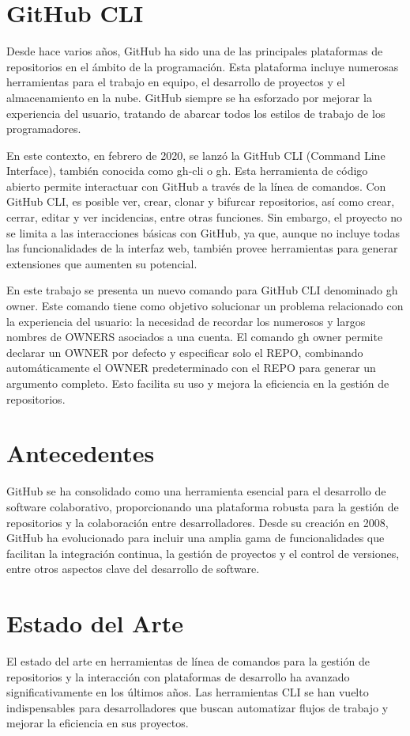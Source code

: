 \section{GitHub CLI}
Desde hace varios años, GitHub ha sido una de las principales plataformas de repositorios en el ámbito de la programación. Esta plataforma incluye numerosas herramientas para el trabajo en equipo, el desarrollo de proyectos y el almacenamiento en la nube. GitHub siempre se ha esforzado por mejorar la experiencia del usuario, tratando de abarcar todos los estilos de trabajo de los programadores.

En este contexto, en febrero de 2020, se lanzó la GitHub CLI (Command Line Interface), también conocida como gh-cli o gh. Esta herramienta de código abierto permite interactuar con GitHub a través de la línea de comandos. Con GitHub CLI, es posible ver, crear, clonar y bifurcar repositorios, así como crear, cerrar, editar y ver incidencias, entre otras funciones. Sin embargo, el proyecto no se limita a las interacciones básicas con GitHub, ya que, aunque no incluye todas las funcionalidades de la interfaz web, también provee herramientas para generar extensiones que aumenten su potencial.

En este trabajo se presenta un nuevo comando para GitHub CLI denominado gh owner. Este comando tiene como objetivo solucionar un problema relacionado con la experiencia del usuario: la necesidad de recordar los numerosos y largos nombres de OWNERS asociados a una cuenta. El comando gh owner permite declarar un OWNER por defecto y especificar solo el REPO, combinando automáticamente el OWNER predeterminado con el REPO para generar un argumento completo. Esto facilita su uso y mejora la eficiencia en la gestión de repositorios.

\section{Antecedentes}
GitHub se ha consolidado como una herramienta esencial para el desarrollo de software colaborativo, proporcionando una plataforma robusta para la gestión de repositorios y la colaboración entre desarrolladores. Desde su creación en 2008, GitHub ha evolucionado para incluir una amplia gama de funcionalidades que facilitan la integración continua, la gestión de proyectos y el control de versiones, entre otros aspectos clave del desarrollo de software.

\section{Estado del Arte}
El estado del arte en herramientas de línea de comandos para la gestión de repositorios y la interacción con plataformas de desarrollo ha avanzado significativamente en los últimos años. Las herramientas CLI se han vuelto indispensables para desarrolladores que buscan automatizar flujos de trabajo y mejorar la eficiencia en sus proyectos.

